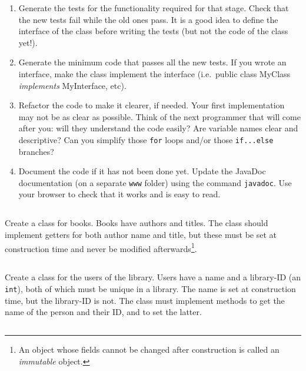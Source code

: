 \documentclass{article}
\begin{document}
\begin{enumerate}
\item Generate the tests for the functionality required for that
  stage. Check that the new tests fail while the old ones pass. It is
  a good idea to define the interface of the class before writing the
  tests (but not the code of the class yet!). 
\item Generate the minimum code that passes all the new tests. If you
  wrote an interface, make the class implement the interface
  (i.e.~public class MyClass \emph{implements} MyInterface, etc). 
\item Refactor the code to make it clearer, if needed. Your first
  implementation may not be as clear as possible. Think of the next
  programmer that will come after you: will they understand the code
  easily? Are variable names clear and descriptive? Can you simplify
  those \verb+for+ loops and/or those \verb+if...else+ branches?
\item Document the
  code if it has not been done yet. Update the JavaDoc documentation
  (on a separate \verb+www+ folder) using the command
  \verb+javadoc+. Use your browser to check that it works and is easy
  to read. 
\end{enumerate}

\subsection{}

Create a class for books. Books have authors and titles. The class
should implement getters for both author name and title, but these
must be set at construction time and never be modified
afterwards\footnote{An object whose fields cannot be changed after
  construction is called an \emph{immutable} object.}.

\subsection{}

Create a class for the users of the library. Users have a name and a
library-ID (an \verb+int+), 
both of which must be unique in a library. The name is
set at construction time, but the library-ID is not. 
The class must implement methods to get the
name of the person and their ID, and to set the latter. 

\subsection{}
\end{document}
